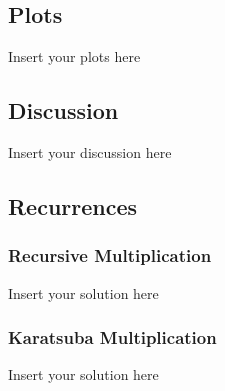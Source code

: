 \documentclass[a4paper]{article}
\begin{document}
\subsection{Plots}

\noindent Insert your plots here

\subsection{Discussion}

\noindent Insert your discussion here

\subsection{Recurrences}

\subsubsection{Recursive Multiplication}

\noindent Insert your solution here

\subsubsection{Karatsuba Multiplication}

\noindent Insert your solution here
\end{document}
